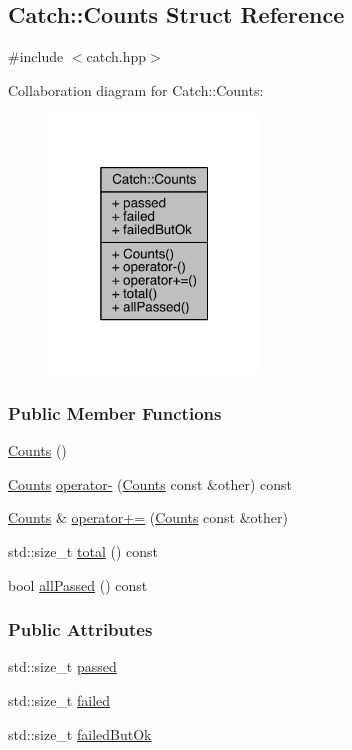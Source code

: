 \hypertarget{a00015}{}\subsection{Catch\+:\+:Counts Struct Reference}
\label{a00015}


{\ttfamily \#include $<$catch.\+hpp$>$}



Collaboration diagram for Catch\+:\+:Counts\+:\nopagebreak
\begin{figure}[H]
\begin{center}
\leavevmode
\includegraphics[width=160pt]{a00185}
\end{center}
\end{figure}
\subsubsection*{Public Member Functions}
\begin{DoxyCompactItemize}
\item 
\hyperlink{a00015_aab9092ce70d4b0179cc743555d2fc39b}{Counts} ()
\item 
\hyperlink{a00015}{Counts} \hyperlink{a00015_aedf86fefe33938d132a6981171cd83e6}{operator-\/} (\hyperlink{a00015}{Counts} const \&other) const 
\item 
\hyperlink{a00015}{Counts} \& \hyperlink{a00015_a322a89475cd2cc039140ef371e973677}{operator+=} (\hyperlink{a00015}{Counts} const \&other)
\item 
std\+::size\+\_\+t \hyperlink{a00015_a9125c662e30114e5c5cc94729b1e9e84}{total} () const 
\item 
bool \hyperlink{a00015_adbbaca552f6017ce69e0d5dc5500bea4}{all\+Passed} () const 
\end{DoxyCompactItemize}
\subsubsection*{Public Attributes}
\begin{DoxyCompactItemize}
\item 
std\+::size\+\_\+t \hyperlink{a00015_ad28daaf3de28006400208b6dd0c631e6}{passed}
\item 
std\+::size\+\_\+t \hyperlink{a00015_a19982a3817a3bc2c07f0290e71f497a3}{failed}
\item 
std\+::size\+\_\+t \hyperlink{a00015_ac090973a2ff51394cd452718e75c073e}{failed\+But\+Ok}
\end{DoxyCompactItemize}



